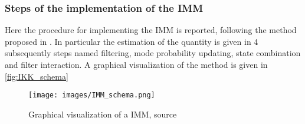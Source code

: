 \subsubsection{Steps of the implementation of the IMM}
Here the procedure for implementing the IMM is reported, following the method proposed in \cite{kalman_based_IMM}. In particular the estimation of the quantity is given in 4 subsequently steps named filtering, mode probability updating, state combination and filter interaction. A graphical visualization of the method is given in \autoref{fig:IKK_schema}
\begin{figure}[H]
  \centering
  \texttt{[image: images/IMM\_schema.png]}
  \caption{Graphical visualization of a IMM, source \cite{kalman_based_IMM}}
  \label{fig:IKK_schema}
\end{figure}

